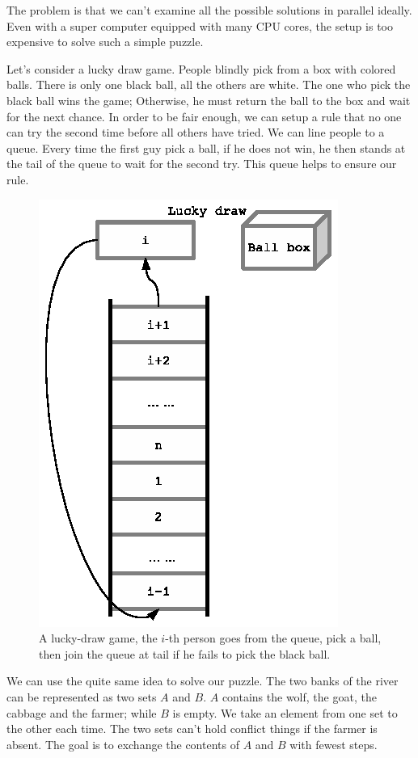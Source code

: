 \documentclass[UTF8]{article}
\begin{document}
The problem is that we can't examine all the possible solutions in parallel ideally.
Even with a super computer equipped with many CPU cores, the setup is too expensive to
solve such a simple puzzle.

Let's consider a lucky draw game. People blindly pick from a box with colored balls. There
is only one black ball, all the others are white. The one who pick the black ball wins the
game; Otherwise, he must return the ball to the box and wait for the next chance.
In order to be fair enough, we can setup a rule that no one can try the second time before
all others have tried. We can line people to a queue. Every time the first guy
pick a ball, if he does not win, he then stands at the tail of the queue to wait for the
second try. This queue helps to ensure our rule.

\begin{figure}[htbp]
 \centering
 \includegraphics[scale=1]{img/lucky-draw.eps}
 \caption{A lucky-draw game, the $i$-th person goes from the queue, pick a ball, then join the queue at tail if he fails to pick the black ball.}
 \label{fig:luck-draw}
\end{figure}

We can use the quite same idea to solve our puzzle. The two banks of the river can be
represented as two sets $A$ and $B$. $A$ contains the wolf, the goat, the cabbage and
the farmer; while $B$ is empty. We take an element from one set to the other
each time. The two sets can't hold conflict things if the farmer is absent. The goal is
to exchange the contents of $A$ and $B$ with fewest steps.
\end{document}
